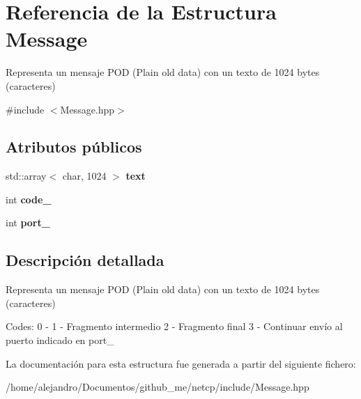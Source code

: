 \hypertarget{structMessage}{}\section{Referencia de la Estructura Message}
\label{structMessage}


Representa un mensaje P\+OD (Plain old data) con un texto de 1024 bytes (caracteres)  




{\ttfamily \#include $<$Message.\+hpp$>$}

\subsection*{Atributos públicos}
\begin{DoxyCompactItemize}
\item 
\mbox{\label{structMessage_a8398aec0171dec03c496704e79fd0022}} 
std\+::array$<$ char, 1024 $>$ {\bfseries text}
\item 
\mbox{\label{structMessage_aaeff602e34763cb97a9fe25d435f7164}} 
int {\bfseries code\+\_\+}
\item 
\mbox{\label{structMessage_af6c004d9113d8d6590cc717ebe4a8c48}} 
int {\bfseries port\+\_\+}
\end{DoxyCompactItemize}


\subsection{Descripción detallada}
Representa un mensaje P\+OD (Plain old data) con un texto de 1024 bytes (caracteres) 

Codes\+: 0 -\/ 1 -\/ Fragmento intermedio 2 -\/ Fragmento final 3 -\/ Continuar envío al puerto indicado en port\+\_\+ 

La documentación para esta estructura fue generada a partir del siguiente fichero\+:\begin{DoxyCompactItemize}
\item 
/home/alejandro/\+Documentos/github\+\_\+me/netcp/include/Message.\+hpp\end{DoxyCompactItemize}
